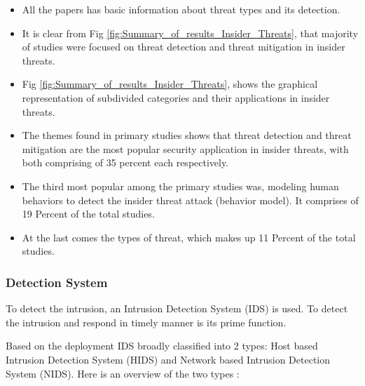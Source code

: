 \documentclass{ijitcs}
\begin{document}
    
\begin{itemize}
    \item   All the papers has basic information about threat types and its detection.
    \item    It is clear from Fig \ref{fig:Summary_of_results_Insider_Threats}, that majority of studies were focused on threat detection and threat mitigation in insider threats.
    \item     Fig  \ref{fig:Summary_of_results_Insider_Threats}, shows the graphical representation of subdivided categories and their applications in insider threats.
    \item      The themes found in primary studies shows   that threat detection and threat mitigation are the most popular security application in insider threats, with both comprising of 35 percent each respectively.
    \item    The third most popular among the primary studies was, modeling human behaviors to detect the insider threat attack (behavior model). It comprises of 19 Percent of the total studies.
    \item     At the last comes the types of threat, which makes up 11 Percent of the total studies.
\end{itemize}


 




\subsubsection{Detection System}


To detect the intrusion, an Intrusion Detection System (IDS) is used. To detect the intrusion and respond in timely manner is its prime function.


Based on the deployment IDS broadly classified into 2 types: Host based Intrusion Detection System (HIDS) and Network based Intrusion Detection System (NIDS).  Here is an overview of the two types \cite{leu2015internal}:     
\end{document}
